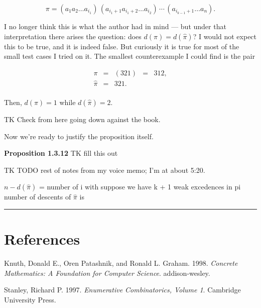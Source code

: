 \documentclass[]{article}
\begin{document}
\[\pi = (a_1 a_2 \ldots a_{i_1}) \,
        (a_{i_1+1} a_{i_1+2} \ldots a_{i_2}) \, \cdots \,
        (a_{i_{k-1}+1} \ldots a_n).\]

I no longer think this is what the author had in mind --- but under that
interpretation there arises the question: does \(d(\pi) = d(\hat\pi)\)?
I would not expect this to be true, and it is indeed false. But
curiously it is true for most of the small test cases I tried on it. The
smallest counterexample I could find is the pair

\[\begin{array}{rcccl}
    \pi & = & (321) & = & 312, \\
\hat\pi & = & 321. \\
\end{array}\]

Then, \(d(\pi) = 1\) while \(d(\hat\pi) = 2\).

TK Check from here going down against the book.

Now we're ready to justify the proposition itself.

\textbf{Proposition 1.3.12} TK fill this out

TK TODO rest of notes from my voice memo; I'm at about 5:20.

\(n - d(\hat\pi)\) = number of i with suppose we have k + 1 weak
excedences in pi number of descents of \(\hat\pi\) is

\begin{center}\rule{0.5\linewidth}{\linethickness}\end{center}

\section*{References}\label{references}

\hypertarget{refs}{}
\hypertarget{ref-concrete}{}
Knuth, Donald E., Oren Patashnik, and Ronald L. Graham. 1998.
\emph{Concrete Mathematics: A Foundation for Computer Science}.
addison-wesley.

\hypertarget{ref-stanley}{}
Stanley, Richard P. 1997. \emph{Enumerative Combinatorics, Volume 1}.
Cambridge University Press.
\end{document}
